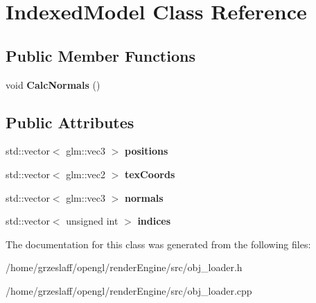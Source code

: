 \hypertarget{classIndexedModel}{\section{Indexed\-Model Class Reference}
\label{classIndexedModel}
}
\subsection*{Public Member Functions}
\begin{DoxyCompactItemize}
\item 
\hypertarget{classIndexedModel_ad7c6f8680a079108e64d463b34dca802}{void {\bfseries Calc\-Normals} ()}\label{classIndexedModel_ad7c6f8680a079108e64d463b34dca802}

\end{DoxyCompactItemize}
\subsection*{Public Attributes}
\begin{DoxyCompactItemize}
\item 
\hypertarget{classIndexedModel_a81d6b9180bd152add38881ed6def521a}{std\-::vector$<$ glm\-::vec3 $>$ {\bfseries positions}}\label{classIndexedModel_a81d6b9180bd152add38881ed6def521a}

\item 
\hypertarget{classIndexedModel_a8b7d3dd202865fb909f6cc07080f0f8d}{std\-::vector$<$ glm\-::vec2 $>$ {\bfseries tex\-Coords}}\label{classIndexedModel_a8b7d3dd202865fb909f6cc07080f0f8d}

\item 
\hypertarget{classIndexedModel_a43a9aa25e0461c1a729693fd7efaf45f}{std\-::vector$<$ glm\-::vec3 $>$ {\bfseries normals}}\label{classIndexedModel_a43a9aa25e0461c1a729693fd7efaf45f}

\item 
\hypertarget{classIndexedModel_ae9ab23aa197180acd72e017503dd6a34}{std\-::vector$<$ unsigned int $>$ {\bfseries indices}}\label{classIndexedModel_ae9ab23aa197180acd72e017503dd6a34}

\end{DoxyCompactItemize}


The documentation for this class was generated from the following files\-:\begin{DoxyCompactItemize}
\item 
/home/grzeslaff/opengl/render\-Engine/src/obj\-\_\-loader.\-h\item 
/home/grzeslaff/opengl/render\-Engine/src/obj\-\_\-loader.\-cpp\end{DoxyCompactItemize}

